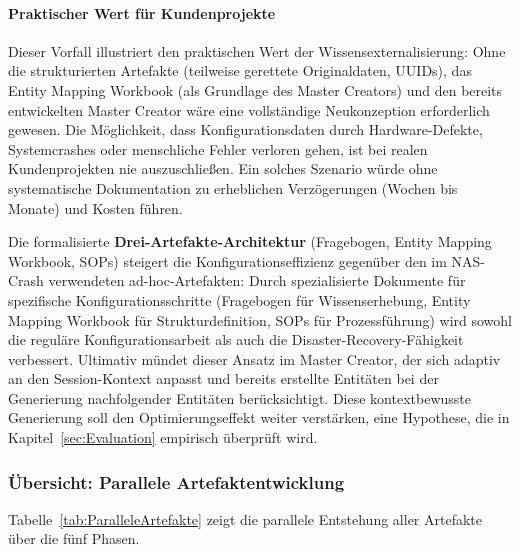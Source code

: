 \paragraph{Praktischer Wert für Kundenprojekte}

Dieser Vorfall illustriert den praktischen Wert der Wissensexternalisierung: Ohne die strukturierten Artefakte (teilweise gerettete Originaldaten, UUIDs), das Entity Mapping Workbook (als Grundlage des Master Creators) und den bereits entwickelten Master Creator wäre eine vollständige Neukonzeption erforderlich gewesen. Die Möglichkeit, dass Konfigurationsdaten durch Hardware-Defekte, Systemcrashes oder menschliche Fehler verloren gehen, ist bei realen Kundenprojekten nie auszuschließen. Ein solches Szenario würde ohne systematische Dokumentation zu erheblichen Verzögerungen (Wochen bis Monate) und Kosten führen.

Die formalisierte \textbf{Drei-Artefakte-Architektur} (Fragebogen, Entity Mapping Workbook, SOPs) steigert die Konfigurationseffizienz gegenüber den im NAS-Crash verwendeten ad-hoc-Artefakten: Durch spezialisierte Dokumente für spezifische Konfigurationsschritte (Fragebogen für Wissenserhebung, Entity Mapping Workbook für Strukturdefinition, SOPs für Prozessführung) wird sowohl die reguläre Konfigurationsarbeit als auch die Disaster-Recovery-Fähigkeit verbessert. Ultimativ mündet dieser Ansatz im Master Creator, der sich adaptiv an den Session-Kontext anpasst und bereits erstellte Entitäten bei der Generierung nachfolgender Entitäten berücksichtigt. Diese kontextbewusste Generierung soll den Optimierungseffekt weiter verstärken, eine Hypothese, die in Kapitel~\ref{sec:Evaluation} empirisch überprüft wird.


\subsubsection{Übersicht: Parallele Artefaktentwicklung}
\label{subsubsec:ParalleleArtefakte}

Tabelle~\ref{tab:ParalleleArtefakte} zeigt die parallele Entstehung aller Artefakte über die fünf Phasen.

